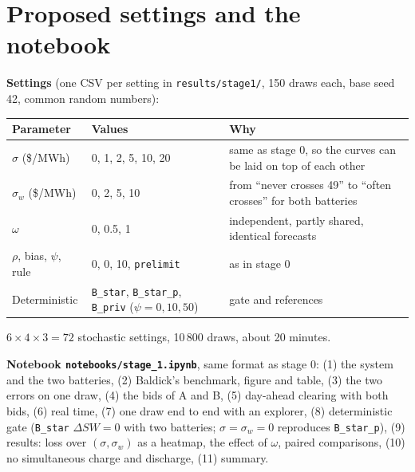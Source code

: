 \documentclass[10pt,a4paper]{article}
\newcommand{\code}[1]{\texttt{#1}}
\begin{document}
\section{Proposed settings and the notebook}
\textbf{Settings} (one CSV per setting in \code{results/stage1/}, 150 draws each, base seed 42, common random
numbers):
\begin{center}\small
\begin{tabularx}{\textwidth}{@{}llX@{}}
\toprule
Parameter & Values & Why\\
\midrule
$\sigma$ (\$/MWh) & 0, 1, 2, 5, 10, 20 & same as stage 0, so the curves can be laid on top of each other\\
$\sigma_w$ (\$/MWh) & 0, 2, 5, 10 & from ``never crosses 49'' to ``often crosses'' for both batteries\\
$\omega$ & 0, 0.5, 1 & independent, partly shared, identical forecasts\\
$\rho$, bias, $\psi$, rule & 0, 0, 10, \code{prelimit} & as in stage 0\\
Deterministic & \code{B\_star}, \code{B\_star\_p}, \code{B\_priv} ($\psi=0,10,50$) & gate and references\\
\bottomrule
\end{tabularx}
\end{center}
$6\times4\times3=72$ stochastic settings, 10\,800 draws, about 20 minutes.

\textbf{Notebook \code{notebooks/stage\_1.ipynb}}, same format as stage 0: (1) the system and the two
batteries, (2) Baldick's benchmark, figure and table, (3) the two errors on one draw, (4) the bids of A and B,
(5) day-ahead clearing with both bids, (6) real time, (7) one draw end to end with an explorer, (8)
deterministic gate (\code{B\_star} $\Delta SW=0$ with two batteries; $\sigma=\sigma_w=0$ reproduces
\code{B\_star\_p}), (9) results: loss over $(\sigma,\sigma_w)$ as a heatmap, the effect of $\omega$, paired
comparisons, (10) no simultaneous charge and discharge, (11) summary.

\end{document}
